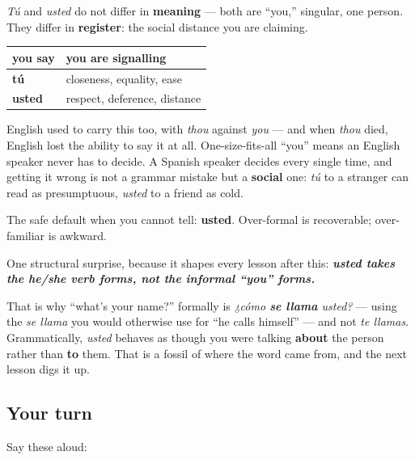 \begin{culture}
\emph{Tú} and \emph{usted} do not differ in \textbf{meaning} — both are \textquotedblleft{}you,\textquotedblright{} singular, one person. They differ in \textbf{register}: the social distance you are claiming.

\noindent
\begin{tabularx}{\linewidth}{@{}>{\raggedright\arraybackslash}X>{\raggedright\arraybackslash}X@{}}
\toprule
\textbf{you say} & \textbf{you are signalling} \\
\midrule
\textbf{tú} & closeness, equality, ease \\
\textbf{usted} & respect, deference, distance \\
\bottomrule
\end{tabularx}

English used to carry this too, with \emph{thou} against \emph{you} — and when \emph{thou} died, English lost the ability to say it at all. One-size-fits-all \textquotedblleft{}you\textquotedblright{} means an English speaker never has to decide. A Spanish speaker decides every single time, and getting it wrong is not a grammar mistake but a \textbf{social} one: \emph{tú} to a stranger can read as presumptuous, \emph{usted} to a friend as cold.

The safe default when you cannot tell: \textbf{usted}. Over-formal is recoverable; over-familiar is awkward.
\end{culture}

\begin{grammarlens}[title={Grammar Lens: usted takes he/she forms}]
One structural surprise, because it shapes every lesson after this: \emph{\textbf{usted\emph{ takes the }he/she\emph{ verb forms\textbf{, not the informal \textquotedblleft{}you\textquotedblright{} forms.}}}}

That is why \textquotedblleft{}what's your name?\textquotedblright{} formally is \emph{¿cómo \textbf{se llama} usted?} — using the \emph{se llama} you would otherwise use for \textquotedblleft{}he calls himself\textquotedblright{} — and not \emph{te llamas}. Grammatically, \emph{usted} behaves as though you were talking \textbf{about} the person rather than \textbf{to} them. That is a fossil of where the word came from, and the next lesson digs it up.
\end{grammarlens}

\subsection*{Your turn}
Say these aloud:

